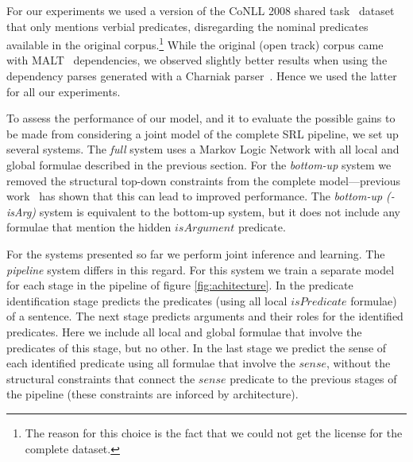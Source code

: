 
For our experiments we used a version of the CoNLL 2008 shared task~\citep{surdeanu08conll} dataset that only mentions verbial predicates, disregarding the nominal predicates available in the original corpus.\footnote{The reason for this choice is the fact that we could not get the license for the complete dataset.} While the original (open track) corpus came with MALT~\citep{nivre2007mli} dependencies, we observed slightly better results when using the dependency parses generated with a Charniak parser~\citep{charniak00amaximum}. Hence we used the latter for all our experiments.


To assess the performance of our model, and it to evaluate the possible gains to be made from considering a joint model of the complete SRL pipeline, we set up several systems. The \emph{full} system uses a Markov Logic Network with all local and global formulae described in the previous section. For the \emph{bottom-up} system we removed the structural top-down constraints from the complete model---previous work~\citet{riedel08collective} has shown that this can lead to improved performance. The \emph{bottom-up (-isArg)} system is equivalent to the bottom-up system, but it does not include any formulae that mention the hidden $isArgument$ predicate.

For the systems presented so far we perform joint inference and learning. The \emph{pipeline} system differs in this regard. For this system we train a separate model for each stage in the pipeline of figure \ref{fig:achitecture}. 
In the predicate identification stage predicts the predicates (using all local $isPredicate$ formulae) of a sentence. The next stage predicts arguments and their roles for the identified predicates. Here we include all local and global formulae that involve the predicates of this stage, but no other. In the last stage we predict the sense of each identified predicate using all formulae that involve the $sense$, without the structural constraints that connect the $sense$ predicate to the previous stages of the pipeline (these constraints are inforced by architecture).    

